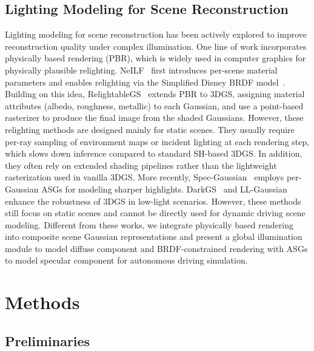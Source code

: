 \documentclass[letterpaper, 10 pt, conference]{ieeeconf}  %
\begin{document}
\subsection{Lighting Modeling for Scene Reconstruction}
Lighting modeling for scene reconstruction has been actively explored to improve reconstruction quality under complex illumination.
One line of work incorporates physically based rendering (PBR), which is widely used in computer graphics for physically plausible relighting.
NeILF~\cite{yao2022neilf} first introduces per-scene material parameters and enables relighting via the Simplified Disney BRDF model~\cite{burley2012physically}.
Building on this idea, RelightableGS~\cite{gao2024relightable} extends PBR to 3DGS, assigning material attributes (albedo, roughness, metallic) to each Gaussian, and use a point-based rasterizer to produce the final image from the shaded Gaussians.
However, these relighting methods are designed mainly for static scenes.
They usually require per-ray sampling of environment maps or incident lighting at each rendering step, which slows down inference compared to standard SH-based 3DGS.
In addition, they often rely on extended shading pipelines rather than the lightweight rasterization used in vanilla 3DGS. 
%
More recently, Spec-Gaussian~\cite{yang2024spec} employs per-Gaussian ASGs for modeling sharper highlights.
DarkGS~\cite{zhang2024darkgs} and LL-Gaussian~\cite{sun2025ll} enhance the robustness of 3DGS in low-light scenarios.
However, these methods still focus on static scenes and cannot be directly used for dynamic driving scene modeling.
Different from these works, we integrate physically based rendering into composite scene Gaussian representations and present a global illumination module to model diffuse component and BRDF-constrained rendering with ASGs to model specular component for autonomous driving simulation.



\section{Methods}
\subsection{Preliminaries}
\end{document}
